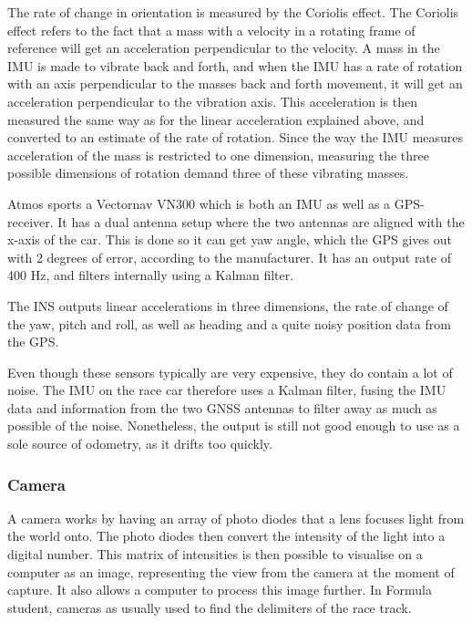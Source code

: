 The rate of change in orientation is measured by the Coriolis effect. The Coriolis effect refers to the fact that a mass with a velocity in a rotating frame of reference will get an acceleration perpendicular to the velocity. A mass in the \gls{IMU} is made to vibrate back and forth, and when the \gls{IMU} has a rate of rotation  with an axis perpendicular to the masses back and forth movement, it will get an acceleration perpendicular to the vibration axis. This acceleration is then measured the same way as for the linear acceleration explained above, and converted to an estimate of the rate of rotation. Since the way the \gls{IMU} measures acceleration of the mass is restricted to one dimension, measuring the three possible dimensions of rotation demand three of these vibrating masses. 

Atmos sports a Vectornav VN300 which is both an \gls{IMU} as well as a \gls{GPS}-receiver. It has a dual antenna setup where the two antennas are aligned with the x-axis of the car. This is done so it can get yaw angle, which the GPS gives out with 2 degrees of error, according to the manufacturer. It has an output rate of 400 \si{\hertz}, and filters internally using a Kalman filter. 

The INS outputs linear accelerations in three dimensions, the rate of change of the yaw, pitch and roll, as well as heading and a quite noisy position data from the GPS. 

Even though these sensors typically are very expensive, they do contain a lot of noise. The \gls{IMU} on the race car therefore uses a Kalman filter, fusing the \gls{IMU} data and information from the two \gls{GNSS} antennas to filter away as much as possible of the noise. Nonetheless, the output is still not good enough to use as a sole source of odometry, as it drifts too quickly.

\subsubsection{Camera}

A camera works by having an array of photo diodes that a lens focuses light from the world onto. The photo diodes then convert the intensity of the light into a digital number. This matrix of intensities is then possible to visualise on a computer as an image, representing the view from the camera at the moment of capture. It also allows a computer to process this image further. In Formula student, cameras as usually used to find the delimiters of the race track.

